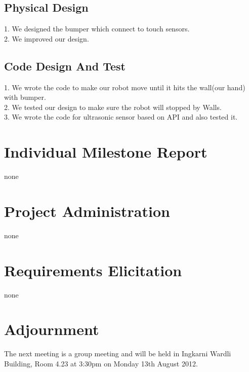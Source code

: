 \documentclass[11pt, a4paper]{article}
\begin{document}
\subsection{Physical Design}
1. We designed the bumper which connect to touch sensors.\\
2. We improved our design.

\subsection{Code Design And Test}
1. We wrote the code to make our robot move until it hits the wall(our hand) with bumper.\\
2. We tested our design to make sure the robot will stopped by Walls.\\
3. We wrote the code for ultrasonic sensor based on API and also tested it.\\
\section{Individual Milestone Report}
none


\section{Project Administration}
none


\section{Requirements Elicitation}
none

\section{Adjournment}
The next meeting is a group meeting and will be held in Ingkarni Wardli Building, Room 4.23 at 3:30pm on Monday 13th August 2012.

\vspace*{10pt}
\end{document}
